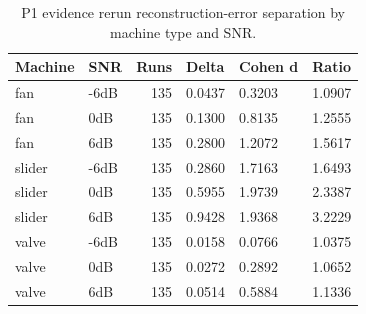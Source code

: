 \begin{table}[t]
\centering
\scriptsize
\setlength{\tabcolsep}{3pt}
\caption{P1 evidence rerun reconstruction-error separation by machine type and SNR.}
\label{tab:p1-evidence-reconstruction}
\begin{tabular}{llrlll}
\toprule
Machine & SNR & Runs & Delta & Cohen d & Ratio \\
\midrule
fan & -6dB & 135 & 0.0437 & 0.3203 & 1.0907 \\
fan & 0dB & 135 & 0.1300 & 0.8135 & 1.2555 \\
fan & 6dB & 135 & 0.2800 & 1.2072 & 1.5617 \\
slider & -6dB & 135 & 0.2860 & 1.7163 & 1.6493 \\
slider & 0dB & 135 & 0.5955 & 1.9739 & 2.3387 \\
slider & 6dB & 135 & 0.9428 & 1.9368 & 3.2229 \\
valve & -6dB & 135 & 0.0158 & 0.0766 & 1.0375 \\
valve & 0dB & 135 & 0.0272 & 0.2892 & 1.0652 \\
valve & 6dB & 135 & 0.0514 & 0.5884 & 1.1336 \\
\bottomrule
\end{tabular}
\end{table}
